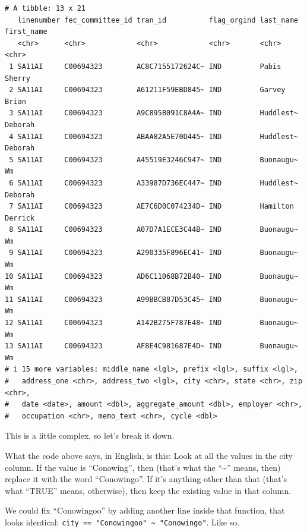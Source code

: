 \documentclass[
  letterpaper,
  DIV=11,
  numbers=noendperiod]{scrreprt}
\begin{document}
\begin{verbatim}
# A tibble: 13 x 21
   linenumber fec_committee_id tran_id          flag_orgind last_name first_name
   <chr>      <chr>            <chr>            <chr>       <chr>     <chr>     
 1 SA11AI     C00694323        AC8C7155172624C~ IND         Pabis     Sherry    
 2 SA11AI     C00694323        A61211F59EBD845~ IND         Garvey    Brian     
 3 SA11AI     C00694323        A9C895B091C8A4A~ IND         Huddlest~ Deborah   
 4 SA11AI     C00694323        ABAA82A5E70D445~ IND         Huddlest~ Deborah   
 5 SA11AI     C00694323        A45519E3246C947~ IND         Buonaugu~ Wm        
 6 SA11AI     C00694323        A33987D736EC447~ IND         Huddlest~ Deborah   
 7 SA11AI     C00694323        AE7C6D0C074234D~ IND         Hamilton  Derrick   
 8 SA11AI     C00694323        A07D7A1ECE3C44B~ IND         Buonaugu~ Wm        
 9 SA11AI     C00694323        A290335F896EC41~ IND         Buonaugu~ Wm        
10 SA11AI     C00694323        AD6C11068B72B40~ IND         Buonaugu~ Wm        
11 SA11AI     C00694323        A99BBCB87D53C45~ IND         Buonaugu~ Wm        
12 SA11AI     C00694323        A142B275F787E48~ IND         Buonaugu~ Wm        
13 SA11AI     C00694323        AF8E4C981687E4D~ IND         Buonaugu~ Wm        
# i 15 more variables: middle_name <lgl>, prefix <lgl>, suffix <lgl>,
#   address_one <chr>, address_two <lgl>, city <chr>, state <chr>, zip <chr>,
#   date <date>, amount <dbl>, aggregate_amount <dbl>, employer <chr>,
#   occupation <chr>, memo_text <chr>, cycle <dbl>
\end{verbatim}

This is a little complex, so let's break it down.

What the code above says, in English, is this: Look at all the values in
the city column. If the value is ``Conowing'', then (that's what the
``\textasciitilde{}'' means, then) replace it with the word
``Conowingo''. If it's anything other than that (that's what ``TRUE''
means, otherwise), then keep the existing value in that column.

We could fix ``Conowingoo'' by adding another line inside that function,
that looks identical:
\texttt{city\ ==\ "Conowingoo"\ \textasciitilde{}\ "Conowingo"}. Like
so.
\end{document}
